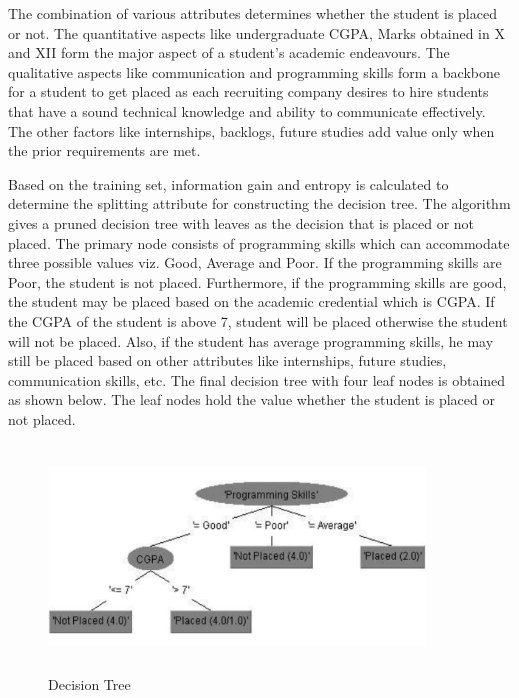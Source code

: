 \documentclass[12pt]{article}
\begin{document}
The combination of various attributes determines 
whether the student is placed or not. The quantitative 
aspects like undergraduate CGPA, Marks obtained in X 
and XII form the major aspect of a student’s academic 
endeavours. The qualitative aspects like communication 
and programming skills form a backbone for a student to 
get placed as each recruiting company desires to hire 
students that have a sound technical knowledge and ability 
to communicate effectively. The other factors like 
internships, backlogs, future studies add value only when 
the prior requirements are met.

Based on the training set, information gain and entropy 
is calculated to determine the splitting attribute for 
constructing the decision tree. The algorithm gives a pruned decision tree with leaves as 
the decision that is placed or not placed. The primary node 
consists of programming skills which can accommodate 
three possible values viz. Good, Average and Poor. If the 
programming skills are Poor, the student is not placed. 
Furthermore, if the programming skills are good, the 
student may be placed based on the academic credential 
which is CGPA. If the CGPA of the student is above 7, 
student will be placed otherwise the student will not be 
placed. Also, if the student has average programming 
skills, he may still be placed based on other attributes like 
internships, future studies, communication skills, etc. 
 The final decision tree with four leaf nodes is obtained 
as shown below. The leaf nodes hold the value whether the 
student is placed or not placed.


\begin{figure}[H]
\begin{center}
 \includegraphics[width=10cm, height=6cm]{L2P1}
\caption{Decision Tree}
\end{center}
\end{figure}
\end{document}
